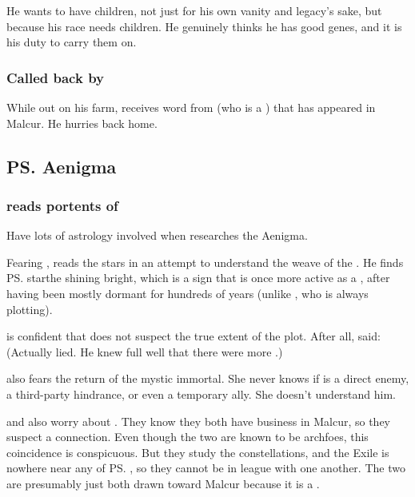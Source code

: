 \begin{garbage}
He wants to have children, not just for his own vanity and legacy's sake, but because his race needs children. 
He genuinely thinks he has good genes, and it is his duty to carry them on. 





\subsubsection{Called back by \Achsah}
While out on his farm, \Teshrial{} receives word from \Achsah{} (who is a ) that \Ishnaruchaefir{} has appeared in Malcur. 
He hurries back home. 









\subsection{\ps{\Ishnaruchaefir} Aenigma}
\subsubsection{\Teshrial{} reads portents of \Ishna}
Have lots of astrology involved when \Teshrial{} researches the Aenigma. 

Fearing \Ishnaruchaefir, \Teshrial{} reads the stars in an attempt to understand the weave of the \matrices. 
He finds \ps{\Ishnaruchaefir} star\dash the \dash shining bright, which is a sign that \Ishnaruchaefir{} is once more active as a \vertex, after having been mostly dormant for hundreds of years (unlike \Secherdamon, who is always plotting). 

\Teshrial{} is confident that \Ishnaruchaefir{} does not suspect the true extent of the \ghobal{} plot. 
After all, \Ishnaruchaefir{} said: 
(Actually \Ishnaruchaefir{} lied. 
 He knew full well that there were more \ghobaleth.)

\Achsah{} also fears the return of the mystic immortal. 
She never knows if \Ishnaruchaefir{} is a direct enemy, a third-party hindrance, or even a temporary ally. 
She doesn't understand him. 

\Achsah{} and \Teshrial{} also worry about \Secherdamon.
They know they both have business in Malcur, so they suspect a connection. 
Even though the two are known to be archfoes, this coincidence is conspicuous. 
But they study the constellations, and the Exile is nowhere near any of \ps{\Secherdamon} \matrices, so they cannot be in league with one another. 
The two are presumably just both drawn toward Malcur because it is a \nexus. 






\end{garbage}
